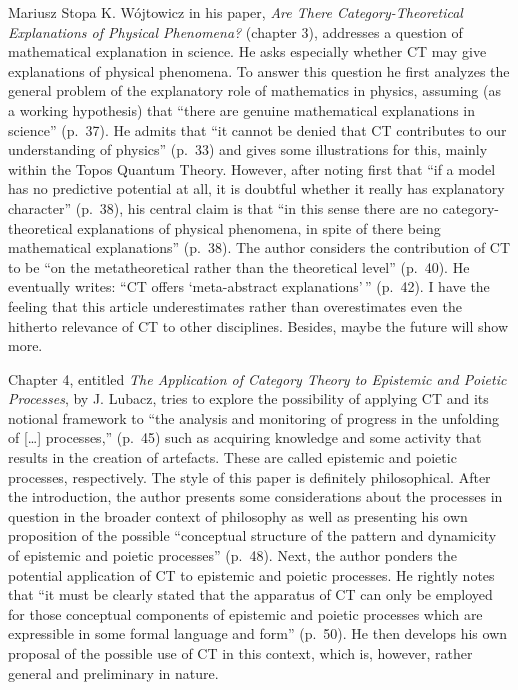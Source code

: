 \begin{recengenv}{Mariusz Stopa}
K. Wójtowicz in his paper, \textit{Are There Category-Theoretical Explanations of Physical Phenomena?} (chapter 3), addresses a question of mathematical explanation in science. He asks especially whether CT may give explanations of physical phenomena. To answer this question he first analyzes the general problem of the explanatory role of mathematics in physics, assuming (as a working hypothesis) that ``there are genuine mathematical explanations in science'' (p.~37). He admits that ``it cannot be denied that CT contributes to our understanding of physics'' (p.~33) and gives some illustrations for this, mainly within the Topos Quantum Theory. However, after noting first that ``if a model has no predictive potential at all, it is doubtful whether it really has explanatory character'' (p.~38), his central claim is that ``in this sense there are no cat\-e\-go\-ry-theoretical explanations of physical phenomena, in spite of there being mathematical explanations'' (p.~38). The author considers the contribution of CT to be ``on the metatheoretical rather than the theoretical level'' (p.~40). He eventually writes: ``CT offers `meta-abstract explanations'$\,\!$'' (p.~42). I have the feeling that this article underestimates rather than overestimates even the hitherto relevance of CT to other disciplines. Besides, maybe the future will show more.


Chapter 4, entitled \textit{The Application of Category Theory to Epistemic and Poietic Processes}, by J. Lubacz, tries to explore the possibility of applying CT and its notional framework to ``the analysis and monitoring of progress in the unfolding of [\ldots] processes,'' (p.~45) such as acquiring knowledge and some activity that results
in the creation of artefacts. These are called epistemic and poietic processes, respectively. The style of this paper is definitely philosophical. After the introduction, the author presents some considerations about the processes in question in the broader context of philosophy as well as presenting his own proposition of the possible ``conceptual structure of the pattern and dynamicity of epistemic and poietic processes'' (p.~48). Next, the author ponders the potential application of CT to epistemic and poietic processes. He rightly notes that ``it must be clearly stated that the apparatus of CT can only be employed for those conceptual components of epistemic and poietic processes which are expressible in some formal language and form'' (p.~50). He then develops his own proposal of the possible use of CT in this context, which is, however, rather general and preliminary in nature.


\end{recengenv}
